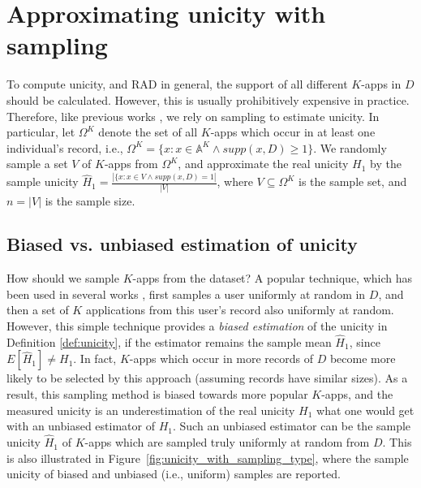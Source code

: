 \documentclass{acm_proc_article-sp}
\theoremstyle{plain}
\theoremstyle{plain}
\theoremstyle{plain}
\theoremstyle{plain}
\theoremstyle{plain}
\theoremstyle{plain}
\begin{document}
\section{Approximating unicity with sampling}
\label{sec:sampling}

To compute unicity, and RAD in general, the support of all different $K$-apps in $D$ should be calculated. 
However, this is usually prohibitively expensive in practice.
Therefore, like previous works \cite{Science15, Nature13}, we rely on sampling to estimate unicity. 
In particular, let $\Omega^K$ denote the set of all $K$-apps which occur in at least one individual's record, i.e., $\Omega^K = \{x : x \in \mathbb{A}^K \wedge \mathit{supp}(x,D) \geq  1\}$.
We randomly sample a set $V$ of $K$-apps from $\Omega^K$, and approximate the real unicity $H_1$ by the sample unicity $\hat{H}_1 = 
 \frac{|\{x : x \in V \wedge \mathit{supp}(x,D)=1|}{|V|}$, where $V \subseteq \Omega^K$ is the sample set, and $n=|V|$ is the sample size.

\subsection{Biased vs. unbiased estimation of unicity}
\label{sec:biased}
How should we sample $K$-apps from the dataset? A popular technique, which has been used in several works \cite{Science15, Nature13},  first samples a user uniformly at random in $D$, and then a set of $K$ applications from this user's record also uniformly at random. However, this simple technique provides a \emph{biased estimation} of the unicity in Definition \ref{def:unicity}, if the estimator remains the sample mean $\hat{H}_1$, since $E[\hat{H}_1] \neq H_1$.  
In fact, $K$-apps which occur in more records of $D$ become more likely to be selected by this approach (assuming records have similar sizes). 
As a result, this sampling method is biased towards more popular $K$-apps, and the measured unicity is an underestimation of the real unicity $H_1$ what one would get with an unbiased estimator of $H_1$. Such an unbiased estimator can be the sample unicity $\hat{H}_1$ of $K$-apps which are sampled truly uniformly at random from $D$. 
This is also illustrated in Figure~\ref{fig:unicity_with_sampling_type}, where the sample unicity of biased and unbiased (i.e., uniform) samples are reported.
\end{document}

